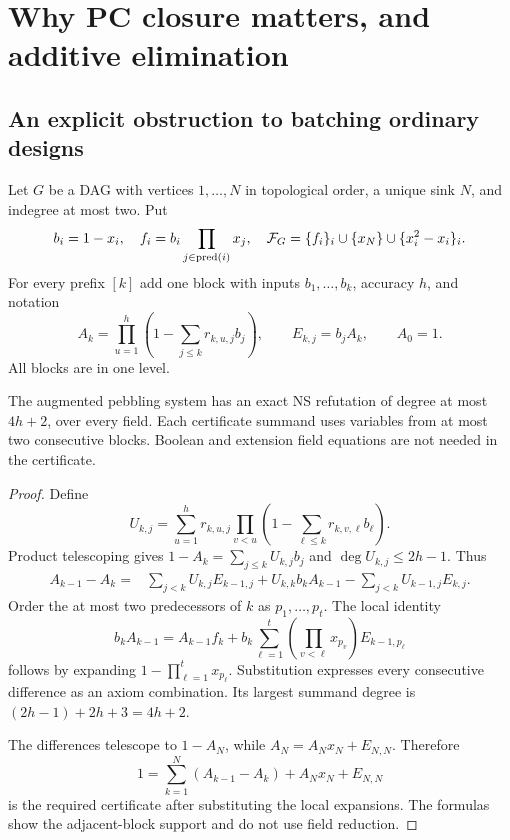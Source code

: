 \chapter{Why PC closure matters, and additive elimination}\label{ch:elimination}

\section{An explicit obstruction to batching ordinary designs}
Let $G$ be a DAG with vertices $1,\ldots,N$ in topological order, a unique sink $N$, and indegree at most two. Put
\[
 b_i=1-x_i,\quad f_i=b_i\prod_{j\in\operatorname{pred}(i)}x_j,
 \quad\mathcal F_G=\{f_i\}_i\cup\{x_N\}\cup\{x_i^2-x_i\}_i.
\]
For every prefix $[k]$ add one block with inputs $b_1,\ldots,b_k$, accuracy $h$, and notation
\[
 A_k=\prod_{u=1}^h(1-\sum_{j\le k}r_{k,u,j}b_j),\qquad
 E_{k,j}=b_jA_k,\qquad A_0=1.
\]
All blocks are in one level.

\begin{lemma}\label{lem:prefixcertificate}
The augmented pebbling system has an exact NS refutation of degree at most $4h+2$, over every field. Each certificate summand uses variables from at most two consecutive blocks. Boolean and extension field equations are not needed in the certificate.
\end{lemma}
\begin{proof}
Define
\[
 U_{k,j}=\sum_{u=1}^h r_{k,u,j}
 \prod_{v<u}(1-\sum_{\ell\le k}r_{k,v,\ell}b_\ell).
\]
Product telescoping gives $1-A_k=\sum_{j\le k}U_{k,j}b_j$ and $\deg U_{k,j}\le2h-1$. Thus
\begin{align*}
 A_{k-1}-A_k={}&\sum_{j<k}U_{k,j}E_{k-1,j}
 +U_{k,k}b_kA_{k-1}
 -\sum_{j<k}U_{k-1,j}E_{k,j}.
\end{align*}
Order the at most two predecessors of $k$ as $p_1,\ldots,p_t$. The local identity
\[
 b_kA_{k-1}=A_{k-1}f_k+
 b_k\sum_{\ell=1}^t\left(\prod_{v<\ell}x_{p_v}\right)E_{k-1,p_\ell}
\]
follows by expanding $1-\prod_{\ell=1}^tx_{p_\ell}$. Substitution expresses every consecutive difference as an axiom combination. Its largest summand degree is
$(2h-1)+2h+3=4h+2$.

The differences telescope to $1-A_N$, while
$A_N=A_Nx_N+E_{N,N}$. Therefore
\[
 1=\sum_{k=1}^N(A_{k-1}-A_k)+A_Nx_N+E_{N,N}
\]
is the required certificate after substituting the local expansions. The formulas show the adjacent-block support and do not use field reduction.
\end{proof}

